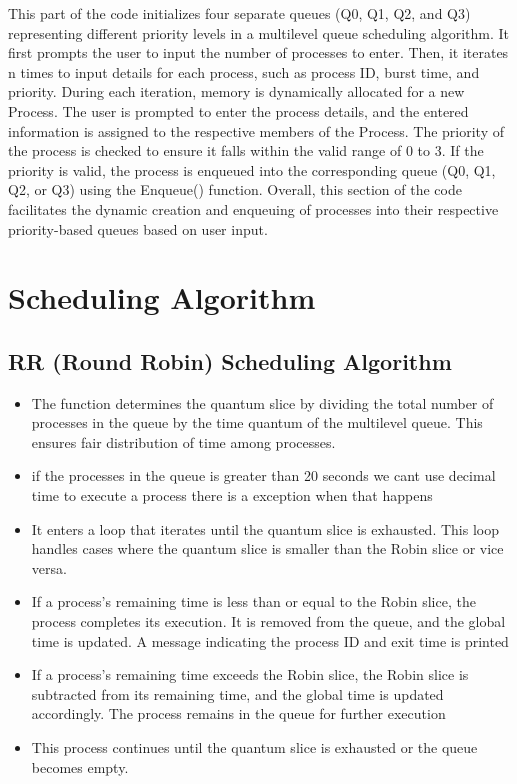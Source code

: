 \documentclass{article}
\begin{document}
\newpage
This part of the code initializes four separate queues (Q0, Q1, Q2, and Q3) representing different priority levels in a multilevel queue scheduling algorithm. It first prompts the user to input the number of processes to enter. Then, it iterates n times to input details for each process, such as process ID, burst time, and priority.
During each iteration, memory is dynamically allocated for a new Process. The user is prompted to enter the process details, and the entered information is assigned to the respective members of the Process.
The priority of the process is checked to ensure it falls within the valid range of 0 to 3. If the priority is valid, the process is enqueued into the corresponding queue (Q0, Q1, Q2, or Q3) using the Enqueue() function.
Overall, this section of the code facilitates the dynamic creation and enqueuing of processes into their respective priority-based queues based on user input.

\vspace{\baselineskip}
\section{Scheduling Algorithm}
\vspace{\baselineskip}
\subsection{RR (Round Robin) Scheduling Algorithm}
\begin{itemize}
    \item The function determines the quantum slice by dividing the total number of processes in the queue by the time quantum of the multilevel queue. This ensures fair distribution of time among processes.
    \item if the processes in the queue is greater than 20 seconds we cant use decimal time to execute a process there is a exception when that happens
    \item It enters a loop that iterates until the quantum slice is exhausted. This loop handles cases where the quantum slice is smaller than the Robin slice or vice versa.
    \item If a process's remaining time is less than or equal to the Robin slice, the process completes its execution. It is removed from the queue, and the global time is updated. A message indicating the process ID and exit time is printed
    \item If a process's remaining time exceeds the Robin slice, the Robin slice is subtracted from its remaining time, and the global time is updated accordingly. The process remains in the queue for further execution
    \item This process continues until the quantum slice is exhausted or the queue becomes empty.
\end{itemize}
\end{document}
